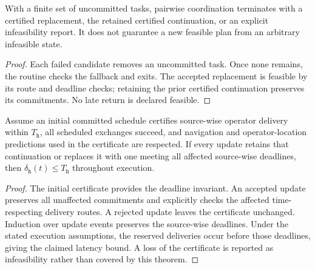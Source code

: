 \begin{revision}
\begin{lemma}
\label{ch05:prop:exist-solution}
With a finite set of uncommitted tasks, pairwise coordination terminates
with a certified replacement, the retained certified continuation, or an
explicit infeasibility report. It does not guarantee a new feasible plan
from an arbitrary infeasible state.
\end{lemma}
\begin{proof}
Each failed candidate removes an uncommitted task. Once none remains, the
routine checks the fallback and exits. The accepted replacement is feasible
by its route and deadline checks; retaining the prior certified continuation
preserves its commitments. No late return is declared feasible.
\end{proof}

\begin{theorem}
\label{ch05:prop:Ts-constraint}
Assume an initial committed schedule certifies source-wise operator delivery
within $T_{\texttt h}$, all scheduled exchanges succeed, and navigation and
operator-location predictions used in the certificate are respected.
If every update retains that continuation or replaces it with one meeting
all affected source-wise deadlines, then
$\delta_{\texttt h}(t)\le T_{\texttt h}$ throughout execution.
\end{theorem}
\begin{proof}
The initial certificate provides the deadline invariant. An accepted update
preserves all unaffected commitments and explicitly checks the affected
time-respecting delivery routes. A rejected update leaves the certificate
unchanged. Induction over update events preserves the source-wise deadlines.
Under the stated execution assumptions, the reserved deliveries occur before
those deadlines, giving the claimed latency bound. A loss of the certificate
is reported as infeasibility rather than covered by this theorem.
\end{proof}
\end{revision}


